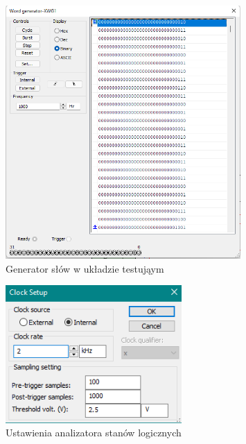 \documentclass{article}
\begin{document}
\begin{figure}[H]
    \centering
    \includegraphics[width=0.8\textwidth]{3c_test_gen.png}
    \caption{Generator słów w układzie testująym}
\end{figure}

\begin{figure}[H]
    \centering
    \includegraphics[width=0.6\textwidth]{3c_test_ana_ust.png}
    \caption{Ustawienia analizatora stanów logicznych}
\end{figure}
\end{document}
